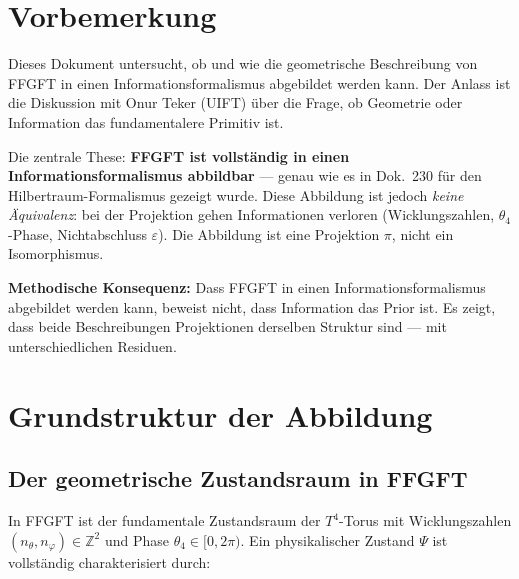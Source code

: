
\section*{Vorbemerkung}

Dieses Dokument untersucht, ob und wie die geometrische Beschreibung von FFGFT
in einen Informationsformalismus abgebildet werden kann. Der Anlass ist die
Diskussion mit Onur Teker (UIFT) über die Frage, ob Geometrie oder Information
das fundamentalere Primitiv ist.

Die zentrale These: \textbf{FFGFT ist vollständig in einen
Informationsformalismus abbildbar} --- genau wie es in Dok.~230 für den
Hilbertraum-Formalismus gezeigt wurde. Diese Abbildung ist jedoch
\emph{keine Äquivalenz}: bei der Projektion gehen Informationen verloren
(Wicklungszahlen, $\theta_4$-Phase, Nichtabschluss $\varepsilon$).
Die Abbildung ist eine Projektion $\pi$, nicht ein Isomorphismus.

\textbf{Methodische Konsequenz:} Dass FFGFT in einen
Informationsformalismus abgebildet werden kann, beweist nicht,
dass Information das Prior ist. Es zeigt, dass beide Beschreibungen
Projektionen derselben Struktur sind --- mit unterschiedlichen Residuen.

\section{Grundstruktur der Abbildung}

\subsection{Der geometrische Zustandsraum in FFGFT}

In FFGFT ist der fundamentale Zustandsraum der $T^4$-Torus mit
Wicklungszahlen $(n_\theta, n_\varphi) \in \mathbb{Z}^2$ und Phase
$\theta_4 \in [0, 2\pi)$. Ein physikalischer Zustand $\Psi$ ist
vollständig charakterisiert durch:


